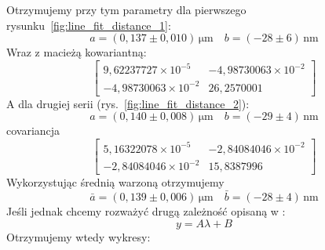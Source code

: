 \documentclass[12pt]{article}
\begin{document}
Otrzymujemy przy tym parametry dla pierwszego rysunku~\ref{fig:line_fit_distance_1}:
\[
	a = (0{,}137 \pm 0{,}010) \, \mathrm{\mu m} \quad b = (-28 \pm 6) \, \mathrm{nm}
\]
Wraz z macieżą kowariantną:
\[
	\begin{bmatrix}
		9{,}62237727 \times 10^{-5}  & -4{,}98730063 \times 10^{-2} \\
		-4{,}98730063 \times 10^{-2} & 26{,}2570001
	\end{bmatrix}
\]
A dla drugiej serii (rys.~\ref{fig:line_fit_distance_2}):
\[
	a = (0{,}140 \pm 0{,}008) \, \mathrm{\mu m} \quad b = (-29 \pm 4) \, \mathrm{nm}
\]
covariancja
\[
	\begin{bmatrix}
		5{,}16322078 \times 10^{-5}  & -2{,}84084046 \times 10^{-2} \\
		-2{,}84084046 \times 10^{-2} & 15{,}8387996
	\end{bmatrix}
\]
Wykorzystując średnią warzoną otrzymujemy
\[
	\bar{a} = (0{,}139 \pm 0{,}006) \, \mathrm{\mu m} \quad \bar{b} = (-28 \pm 4) \, \mathrm{nm}
\]
Jeśli jednak chcemy rozważyć drugą zależność opisaną w \cite{skrypt}:
\[
	y = A\lambda + B
\]
Otrzymujemy wtedy wykresy:
\end{document}

